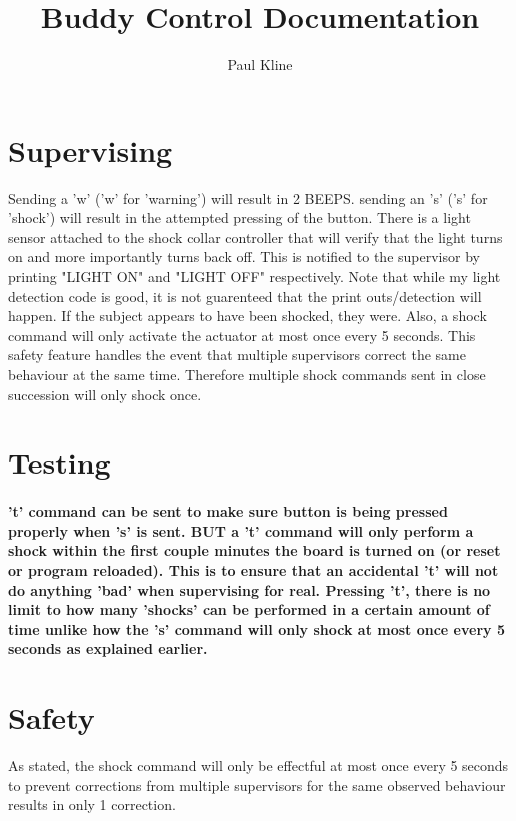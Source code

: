 \documentclass[10pt,a4paper]{article}
\author{Paul Kline}
\title{Buddy Control Documentation}
\begin{document}
\maketitle
\tableofcontents

\section{Supervising}
Sending a 'w' ('w' for 'warning') will result in 2 BEEPS. sending an 's' ('s' for 'shock') will result in the attempted pressing of the button. There is a light sensor attached to the shock collar controller that will verify that the light turns on and more importantly turns back off. This is notified to the supervisor by printing "LIGHT ON" and "LIGHT OFF" respectively. Note that while my light detection code is good, it is not guarenteed that the print outs/detection will happen. If the subject appears to have been shocked, they were. Also, a shock command will only activate the actuator at most once every 5 seconds. This safety feature handles the event that multiple supervisors correct the same behaviour at the same time. Therefore multiple shock commands sent in close succession will only shock once.

\section{Testing}
\paragraph{'t' command can be sent to make sure button is being pressed properly when 's' is sent. BUT a 't' command will only perform a shock within the first couple minutes the board is turned on (or reset or program reloaded). This is to ensure that an accidental 't' will not do anything 'bad' when supervising for real. Pressing 't', there is no limit to how many 'shocks' can be performed in a certain amount of time unlike how the 's' command will only shock at most once every 5 seconds as explained earlier.}
\section{Safety}
As stated, the shock command will only be effectful at most once every 5 seconds to prevent corrections from multiple supervisors for the same observed behaviour results in only 1 correction.
\end{document}
